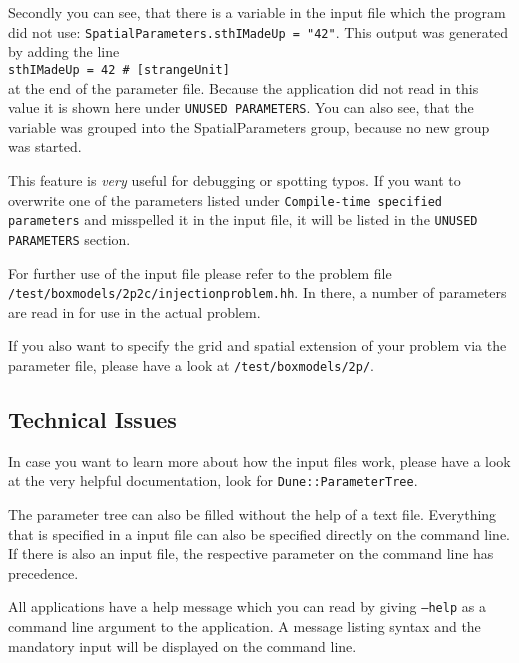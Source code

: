 Secondly you can see, that there is a variable in the input  file which the program did not use:
\newline
\texttt{SpatialParameters.sthIMadeUp = "42"}.
\newline 
This output was generated by adding the line \\
\lstinline{sthIMadeUp = 42 # [strangeUnit]}\\
at the end of the parameter file. Because the application did not read in this value it is shown here under \texttt{UNUSED PARAMETERS}. You can also see, that the variable was grouped into the SpatialParameters group, because no new group was started. 

This feature is \emph{very} useful for debugging or spotting typos. If you want to overwrite one of the parameters listed under \texttt{Compile-time specified parameters} and misspelled it in the input file, it will be listed in the  \texttt{UNUSED PARAMETERS} section. 

For further use of the input file please refer to the problem file 
\newline 
\texttt{/test/boxmodels/2p2c/injectionproblem.hh}.
\newline
In there, a number of parameters are read in for use in the actual problem. 

If you also want to specify  the grid and spatial extension of your problem via the parameter file, please have a look at 
  \newline 
\texttt{/test/boxmodels/2p/}.
  
\subsection{Technical Issues}
In case you want to learn more about how the input files work, please have a look at the very helpful \Dune documentation, look for \texttt{Dune::ParameterTree}.
  
The parameter tree can also be filled without the help of a text file. Everything that is specified in a \Dumux input file can also be specified directly on the command line. If there is also an input file, the respective parameter on the command line has precedence. 

All applications have a help message which you can read by giving \texttt{--help}   as a command line argument to the application. A message listing syntax and the mandatory input will be displayed on the command line. 
  
  
